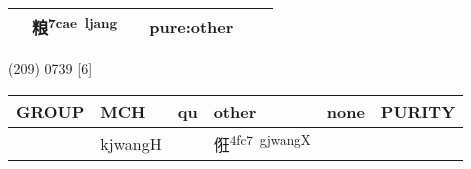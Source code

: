\documentclass[14pt,a4paper]{scrartcl}
\begin{document}
\begin{longtable}[c]{@{}llllll@{}}
\begin{minipage}[t]{0.14\columnwidth}\raggedright\strut
\strut\end{minipage} &
\begin{minipage}[t]{0.14\columnwidth}\raggedright\strut
粮\textsuperscript{7cae~ljang}
\strut\end{minipage} &
\begin{minipage}[t]{0.14\columnwidth}\raggedright\strut
\strut\end{minipage} &
\begin{minipage}[t]{0.14\columnwidth}\raggedright\strut
pure:other
\strut\end{minipage}\tabularnewline
\bottomrule
\end{longtable}

(209) 0739 {[}6{]}

\begin{longtable}[c]{@{}llllll@{}}
\toprule
\begin{minipage}[b]{0.14\columnwidth}\raggedright\strut
GROUP
\strut\end{minipage} &
\begin{minipage}[b]{0.14\columnwidth}\raggedright\strut
MCH
\strut\end{minipage} &
\begin{minipage}[b]{0.14\columnwidth}\raggedright\strut
qu
\strut\end{minipage} &
\begin{minipage}[b]{0.14\columnwidth}\raggedright\strut
other
\strut\end{minipage} &
\begin{minipage}[b]{0.14\columnwidth}\raggedright\strut
none
\strut\end{minipage} &
\begin{minipage}[b]{0.14\columnwidth}\raggedright\strut
PURITY
\strut\end{minipage}\tabularnewline
\midrule
\endhead
\begin{minipage}[t]{0.14\columnwidth}\raggedright\strut
𤝵
\strut\end{minipage} &
\begin{minipage}[t]{0.14\columnwidth}\raggedright\strut
kjwangH
\strut\end{minipage} &
\begin{minipage}[t]{0.14\columnwidth}\raggedright\strut
\strut\end{minipage} &
\begin{minipage}[t]{0.14\columnwidth}\raggedright\strut
俇\textsuperscript{4fc7~gjwangX}
\strut\end{minipage} &

\end{longtable}
\end{document}
